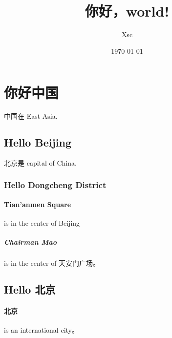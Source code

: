 \documentclass[UTF8]{ctexart}
\title{你好，world!}
\author{Xsc}
\date{\today}
\begin{document}
	\maketitle
	\section{你好中国}
	中国在 East Asia.
	\subsection{Hello Beijing}
	北京是 capital of China.
	\subsubsection{Hello Dongcheng District}
	\paragraph{Tian'anmen Square}
	is in the center of Beijing
	\subparagraph{Chairman Mao}
	is in the center of 天安门广场。
	\subsection{Hello 北京}
	\paragraph{北京} is an international city。
\end{document}
